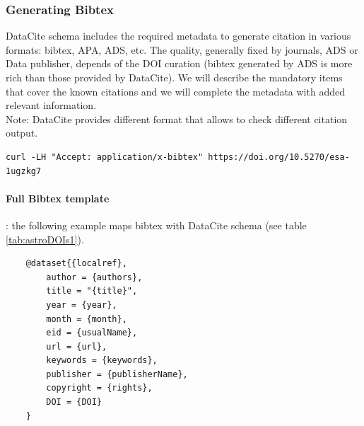 \documentclass[11pt,a4paper]{ivoa}
\begin{document}
\subsubsection{Generating Bibtex}
DataCite schema includes the required metadata to generate citation in various formats: bibtex, APA, ADS, etc. The quality, generally fixed by journals, ADS or Data publisher, depends of the DOI curation (bibtex generated by ADS is more rich than those provided by DataCite). 
We will describe the mandatory items that cover the known citations and we will complete the metadata with added relevant information.\\


Note: DataCite provides different format that allows to check different citation output.

\begin{verbatim}
curl -LH "Accept: application/x-bibtex" https://doi.org/10.5270/esa-1ugzkg7
\end{verbatim}


\paragraph{Full Bibtex template} : the following example maps bibtex with DataCite schema (see table \ref{tab:astroDOIs1}).

\begin{lstlisting}
	@dataset{{localref},
		author = {authors},
		title = "{title}",
		year = {year},
		month = {month},
		eid = {usualName},
		url = {url},
		keywords = {keywords},
		publisher = {publisherName},
		copyright = {rights},
		DOI = {DOI}
	}
\end{lstlisting}
\end{document}

